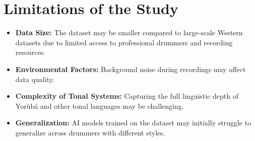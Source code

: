 \documentclass[12pt,a4paper]{article}
\begin{document}
\section{Limitations of the Study}

\begin{itemize}
\item \textbf{Data Size:} The dataset may be smaller compared to large-scale Western datasets due to limited access to professional drummers and recording resources.
\item \textbf{Environmental Factors:} Background noise during recordings may affect data quality.
\item \textbf{Complexity of Tonal Systems:} Capturing the full linguistic depth of Yorùbá and other tonal languages may be challenging.
\item \textbf{Generalization:} AI models trained on the dataset may initially struggle to generalize across drummers with different styles.
\end{itemize}
\end{document}
